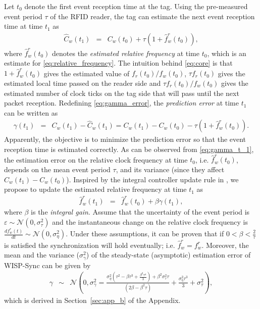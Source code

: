 \documentclass[10pt,journal,compsoc]{IEEEtran}
\begin{document}
Let $t_0$ denote the first event reception time at the tag. Using the pre-measured event period $\tau$ of the RFID reader, the tag can estimate the next event reception time at time $t_1$ as
\begin{eqnarray}
\hat{C}_w(t_1) &=& C_w(t_0)+\tau(1+\hat{f}_w^r(t_0)), \label{eq:core}
\end{eqnarray}
where $\hat{f}_w^r(t_0)$ denotes the \emph{estimated relative frequency} at time $t_0$, which is an estimate for \eqref{eq:relative_frequency}. The intuition behind \eqref{eq:core} is that $1+\hat{f}_w^r(t_0)$ gives the estimated value of $f_r(t_0)/f_w(t_0)$, $\tau f_r(t_0)$ gives the estimated local time passed on the reader side and $\tau f_r(t_0)/f_w(t_0)$ gives the estimated number of clock ticks on the tag side that will pass until the next packet reception. Redefining \eqref{eq:gamma_error}, the \emph{prediction error} at time $t_1$ can be written as
\begin{eqnarray}
\gamma(t_1) & \!\!\!\!\!=\!\!\!\!\!\! & 
C_{w}(t_{1}\!)\!-\!\hat{C}_{w}(t_{1}\!) \!=\! 
C_{w}(t_{1}\!)\!-\!C_{w}(t_{0}\!)\!-\!\tau(1\!\!+\!\!\hat{f}_{w}^{r}(t_0\!)). \label{eq:gamma_t_1}
\end{eqnarray}
Apparently, the objective is to minimize the prediction error so that the event reception time is estimated correctly. As can be observed from \eqref{eq:gamma_t_1}, the estimation error on the relative clock frequency at time $t_0$, i.e. $\hat{f}_w^r(t_0)$, depends on the mean event period $\tau$, and its variance (since they affect $C_w(t_1)-C_w(t_0)$). Inspired by the integral controller update rule in \cite[Section III, (5)]{pi2015}, we propose to update the estimated relative frequency at time $t_1$ as
\begin{eqnarray}
\hat{f}_{w}^{r}(t_1) &=& \hat{f}_{w}^{r}(t_0)+\beta\gamma(t_1), 
\label{eq:update_rule}
\end{eqnarray}
where $\beta$ is the \emph{integral gain}. Assume that the uncertainty of the event period is $\varepsilon\sim\mathcal{N}(0,\sigma^2_{\tau})$ and the instantaneous change on the relative clock frequency is $\frac{df_{w}^{r}(t)}{dt}\sim\mathcal{N}(0,\sigma_{\eta}^{2})$. Under these assumptions, it can be proven that if $0<\beta<\frac{2}{\tau}$ is satisfied the synchronization will hold eventually; i.e. $\hat{f}_{w}^{r}=f_{w}^{r}$. Moreover, the mean and the variance ($\sigma^2_\gamma$) of the steady-state (asymptotic) estimation error of WISP-Sync can be given by 
\begin{eqnarray}
\gamma & \!\!\!\!\!\sim\!\!\!\!\! & \mathcal{N} \!\!\left(\!\!0,\sigma^2_\gamma\!\!=\!\!\frac{\sigma^2_{\eta}\!\left(\!\tau^2\!-\!\beta\tau^3\!+\!\frac{\beta^2\tau^4}{3}\!\right)\!\!+\!\!\beta^2\sigma^2_{\tau}\tau}{(2\beta-\beta^2\tau)}\!\!+\!\!\frac{\sigma^2_{\eta}\tau^3}{3}\!+\!\sigma^2_{\tau} \!\!\right),
\label{eq:sync_performance}
\end{eqnarray}
which is derived in Section~\ref{sec:app_b} of the Appendix.
\end{document}
